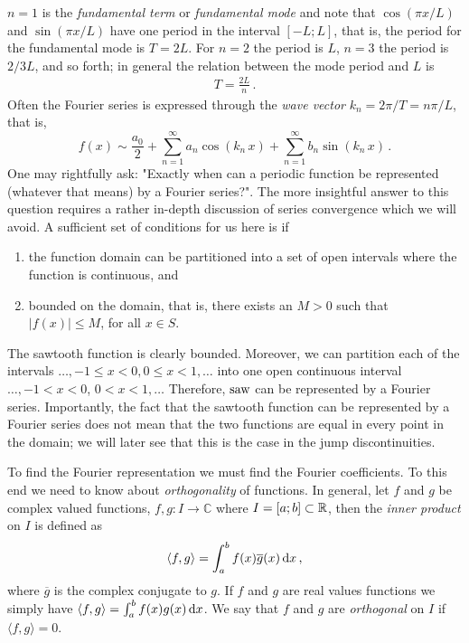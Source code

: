 \noindent $n=1$ is the \emph{fundamental term} or \emph{fundamental mode} and note that 
$\cos(\pi x/L)$ and $\sin(\pi x/L)$ have one period in the interval $[-L; L]$, 
that is, the period for the fundamental mode is $T=2L$. 
For $n=2$ the period is $L$, $n=3$ the period is $2/3L$, and so forth;  
in general the relation between the mode period and $L$ is 
\begin{eqnarray}
	T = \frac{2L}{n} \, .
\end{eqnarray}
Often the Fourier series is expressed through the \emph{wave vector}  $k_n=2\pi/T = n\pi/L$, that is,
\begin{equation}
	f(x) \sim \frac{a_0}{2} + \sum_{n=1}^\infty a_n \cos\left(k_n \, x\right) 
	+ \sum_{n=1}^\infty b_n \sin\left(k_n\, x\right) \, .
\end{equation} 
One may rightfully ask: "Exactly when can a periodic function be represented 
(whatever that means) by a Fourier series?". The more insightful answer to this question 
requires a rather in-depth discussion of series convergence which we will avoid. 
A sufficient set of conditions for us here is if 
\begin{enumerate}
	\item the function domain can be partitioned into a set of open 
		intervals where the function is continuous, and 
	\item bounded on the domain, that is, there exists an 
		$M > 0$ such that $|f(x)| \leq M$, for all $x \in S$.
\end{enumerate}
The sawtooth function is clearly bounded. Moreover, we can partition each of the intervals 
$\ldots, -1 \leq x < 0, 0 \leq x < 1, \ldots$ into one open continuous interval 
$\ldots, -1 < x <0$, $0 < x < 1, \ldots$ Therefore, $\text{saw}$ can be represented by a
Fourier series. Importantly, the fact that the sawtooth function can be represented by a 
Fourier series does not mean that the two functions are equal in every point in the domain; we will
later see that this is the case in the jump discontinuities.  

To find the Fourier representation we must find the Fourier coefficients. To this end we need to know 
about \emph{orthogonality}  of functions. In general, let $f$ and $g$ be complex
valued functions, $f,g: I \rightarrow \mathbb{C}$ where $I = [a; b] \subset \mathbb{R}$, then the \emph{inner product}
 on $I$ is defined as
\begin{eqnarray}
	\label{eq:innerdef}
	\langle f,g\rangle= \int_a^b f(x) \overline{g}(x) \, \mathrm{d} x \, , 
\end{eqnarray}
where $\overline{g}$ is the complex conjugate to $g$. If $f$ and $g$ are real values functions we
simply have $\langle f,g\rangle= \int_a^b f(x) g(x) \, \mathrm{d} x$. We say that $f$ and $g$ are 
\emph{orthogonal} on $I$ if $\langle f,g \rangle = 0$. 

